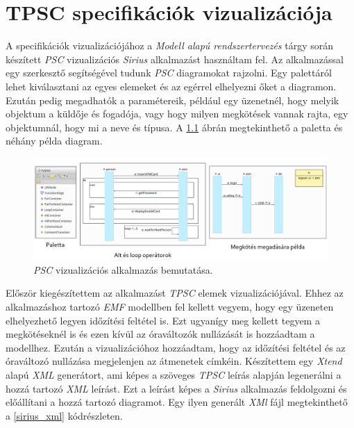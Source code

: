 \chapter{TPSC specifikációk vizualizációja}

A specifikációk vizualizációjához a \textit{Modell alapú rendszertervezés} tárgy során készített \textit{PSC} vizualizációs \textit{Sirius} alkalmazást használtam fel.
Az alkalmazással egy szerkesztő segítségével tudunk \textit{PSC} diagramokat rajzolni.
Egy palettáról lehet kiválasztani az egyes elemeket és az egérrel elhelyezni őket a diagramon.
Ezután pedig megadhatók a paramétereik, például egy üzenetnél, hogy melyik objektum a küldője és fogadója, vagy hogy milyen megkötések vannak rajta, egy objektumnál, hogy mi a neve és típusa.
A \ref{sirius_psc} ábrán megtekinthető a paletta és néhány példa diagram.

\begin{figure}[!ht]
    \centering
    \includegraphics[width=150mm, keepaspectratio]{figures/sirius_psc.png}
    \caption{\textit{PSC} vizualizációs alkalmazás bemutatása.}
    \label{sirius_psc}
\end{figure}

Először kiegészítettem az alkalmazást \textit{TPSC} elemek vizualizációjával.
Ehhez az alkalmazáshoz tartozó \textit{EMF} modellben fel kellett vegyem, hogy egy üzeneten elhelyezhető legyen időzítési feltétel is.
Ezt ugyanígy meg kellett tegyem a megkötéseknél is és ezen kívül az óraváltozók nullázását is hozzáadtam a modellhez.
Ezután a vizualizációhoz hozzáadtam, hogy az időzítési feltétel és az óraváltozó nullázása megjelenjen az átmenetek címkéin.
Készítettem egy \textit{Xtend} alapú \textit{XML} generátort, ami képes a szöveges \textit{TPSC} leírás alapján legenerálni a hozzá tartozó \textit{XML} leírást.
Ezt a leírást képes a \textit{Sirius} alkalmazás feldolgozni és előállítani a hozzá tartozó diagramot.
Egy ilyen generált \textit{XMl} fájl megtekinthető a \ref{sirius_xml} kódrészleten.

